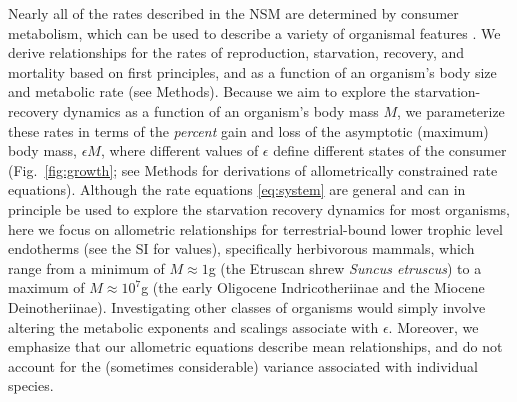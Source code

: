 \documentclass[twocolumn,preprintnumbers,amsmath,amssymb,superscriptaddress]{revtex4}
\begin{document}
Nearly all of the rates described in the NSM are determined by consumer
metabolism, which can be used to describe a variety of organismal features
\citep{Brown:2004wq}.
We derive relationships for the rates of reproduction, starvation, recovery, and mortality based on first principles, and as a function of an organism's body size and metabolic rate (see Methods).
Because we aim to explore the starvation-recovery dynamics as a function of an organism's body mass $M$, we parameterize these rates in terms of the \emph{percent} gain and loss of the asymptotic (maximum) body mass, $\epsilon M$, where different values of $\epsilon$ define different states of the consumer (Fig.~\ref{fig:growth}; see Methods for derivations of allometrically constrained rate equations).
Although the rate equations \eqref{eq:system} are general and can in
principle be used to explore the starvation recovery dynamics for most
organisms, here we focus on allometric relationships for terrestrial-bound
lower trophic level endotherms (see the SI for values), specifically herbivorous mammals, which range from a minimum of $M\approx1$g (the Etruscan shrew \emph{Suncus etruscus}) to a maximum of $M\approx10^7$g (the early Oligocene Indricotheriinae and the Miocene Deinotheriinae).
Investigating other classes of organisms would simply involve altering the metabolic exponents and scalings associate with $\epsilon$. Moreover, we emphasize that our allometric equations describe mean relationships, and do not account for the (sometimes considerable) variance associated with individual species.

\end{document}
